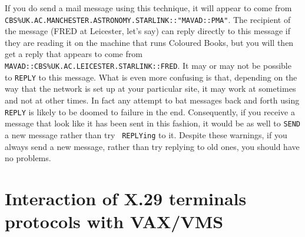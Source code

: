 If you do send a mail message using this technique, it will appear to come from
{\tt CBS\%UK.AC.\-MANCHESTER.\-ASTRONOMY.\-STARLINK::"MAVAD::PMA"}. The
recipient of the message (FRED at Leicester, let's say) can reply directly to
this message if they are reading it on the machine that runs Coloured Books,
but you will then get a reply that appears to come from {\tt
MAVAD::CBS\%UK.AC.\-LEICESTER.\-STARLINK::FRED}.  It may or may not be possible
to {\tt REPLY} to this message. What is even more confusing is that, depending
on the way that the network is set up at your particular site, it may work at
sometimes and not at other times. In fact any attempt to bat messages back and
forth using {\tt REPLY} is likely to be doomed to failure in the end.
Consequently, if you receive a message that look like it has been sent in this
fashion, it would be as well to {\tt SEND} a new message rather than try {\tt
REPLYing} to it. Despite these warnings, if you always send a new message,
rather than try replying to old ones, you should have no problems. 

\section{Interaction of X.29 terminals protocols with VAX/VMS}
\label{pad}

